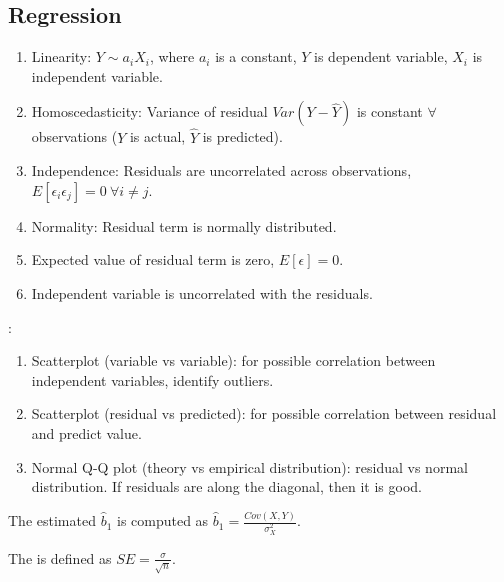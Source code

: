 \subsection{Regression}

\begin{definition} 
\begin{enumerate}[label=\roman*.]
\setlength{\itemsep}{0pt}
\item Linearity: $Y \sim a_i X_i$, where $a_i$ is a constant, $Y$ is dependent variable, $X_i$ is independent variable.
\item Homoscedasticity: Variance of residual $Var(Y - \hat{Y})$ is constant $\forall$ observations ($Y$ is actual, $\hat{Y}$ is predicted).
\item Independence: Residuals are uncorrelated across observations, $E[\epsilon_i \epsilon_j] = 0 \ \forall i \neq j$.
\item Normality: Residual term is normally distributed. 
\item Expected value of residual term is zero, $E[\epsilon] = 0$.
\item Independent variable is uncorrelated with the residuals.
\end{enumerate}
\end{definition}

\begin{definition} :
\begin{enumerate}[label=\roman*.]
\setlength{\itemsep}{0pt}
\item Scatterplot (variable vs variable): for possible correlation between independent variables, identify outliers.
\item Scatterplot (residual vs predicted): for possible correlation between residual and predict value.
\item Normal Q-Q plot (theory vs empirical distribution): residual vs normal distribution. If residuals are along the diagonal, then it is good.
\end{enumerate}
\end{definition}

\begin{definition} The estimated  $\hat{b}_1$ is computed as $\hat{b}_1 = \frac{Cov(X,Y)}{\sigma_X^2}$.
\end{definition}

\begin{definition}The  is defined as $SE = \frac{\sigma}{\sqrt{n}}$.
\end{definition}

